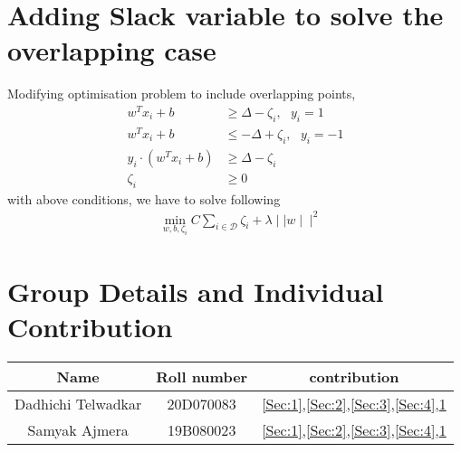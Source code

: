 \documentclass[11pt, twosides]{article}
\begin{document}
\section{Adding Slack variable to solve the overlapping case}
\label{Sec:5}
Modifying optimisation problem to include overlapping points,
\begin{align*}
    w^Tx_i + b &\ge \Delta - \zeta_i, \, \, \, \, y_i = 1\\
    w^Tx_i +b &\le -\Delta + \zeta_i,\, \, \, \, y_i = -1\\
        y_i \cdot \left(w^Tx_i + b \right) &\ge \Delta - \zeta_i \\
\zeta_i &\ge 0
\end{align*}
with above conditions, we have to solve following
\begin{align*}
    &\min_{w,b,\zeta_i} C\sum_{i \in \mathcal{D}} \zeta_i
 + \lambda \mid \mid w \mid \mid ^2 
 \end{align*}


\section{Group Details and Individual Contribution}
\begin{table}[H]
    \centering
    \begin{tabular}{|c|c|c|}
     \hline
        Name & Roll number & contribution \\
        \hline
        Dadhichi Telwadkar & 20D070083 & \ref{Sec:1},\ref{Sec:2},\ref{Sec:3},\ref{Sec:4},\ref{Sec:5}\\
        Samyak Ajmera & 19B080023 & \ref{Sec:1},\ref{Sec:2},\ref{Sec:3},\ref{Sec:4},\ref{Sec:5}\\
    \hline
    \end{tabular}
    \label{tab:my_label}
\end{table}
\end{document}
